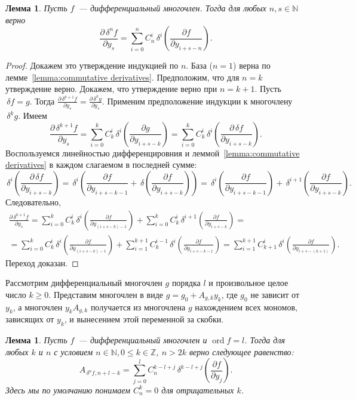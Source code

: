 \documentclass[11pt]{article}
\DeclareMathOperator{\ord}{ord}
\renewcommand{\le}{\leqslant}
\renewcommand{\ge}{\geqslant}
\theoremstyle{plain1}
\newtheorem{lemma}[theorem1]{Лемма}
\theoremstyle{plain2}
\theoremstyle{plain}
\theoremstyle{plain3}
\theoremstyle{definition}
\theoremstyle{remark}
\begin{document}
\begin{lemma}\label{lemma:f^(n)}
Пусть $f$~--- дифференциальный многочлен. Тогда для любых $n, s \in\mathbb{N}$ верно
$$
\frac{\partial \,\delta^n f}{\partial y_s} = \sum\limits_{i=0}^n  C_n^i  \,\delta^i \left(\frac{\partial f}{\partial y_{i+s-n}}\right).
$$
\end{lemma}
\begin{proof}
Докажем это утверждение индукцией по $n$.  База ($n=1$) верна по лемме~\ref{lemma:commutative derivatives}. Предположим, что для $n=k$ утверждение верно.
Докажем, что утверждение верно при $n=k+1$. Пусть $\,\delta f=g$. Тогда
$\frac{\partial \,\delta^{k+1} f}{\partial y_s} = \frac{\partial \,\delta^k g}{\partial y_s}$.
Применим предположение индукции к многочлену $\,\delta^k g$. Имеем 
$$
\frac{\partial \,\delta^{k+1} f}{\partial y_s} =  \sum\limits_{i=0}^k  C_k^i  \,\delta^i \left(\frac{\partial g}{\partial y_{i+s-k}}\right)=\sum\limits_{i=0}^k  C_k^i  \,\delta^i \left(\frac{\partial \,\delta f}{\partial y_{i+s-k}}\right). 
$$
Воспользуемся линейностью дифференцировния и леммой~\ref{lemma:commutative derivatives} в каждом слагаемом в последней сумме:  
$$
\,\delta^i \left(\frac{\partial \,\delta f}{\partial y_{i+s-k}}\right)=\,\delta^i\left(\frac{\partial f}{\partial y_{i+s-k-1}}+\,\delta\left(\frac{\partial f}{\partial y_{i+s-k}}\right)\right)=\,\delta^i\left(\frac{\partial f}{\partial y_{i+s-k-1}}\right)+\,\delta^{i+1}\left(\frac{\partial f}{\partial y_{i+s-k}}\right).
$$ 
Следовательно,
\begin{gather*}
\frac{\partial \,\delta^{k+1} f}{\partial y_s}=\sum\limits_{i=0}^k  C_k^i \,\delta^i \left(\frac{\partial f}{\partial y_{(i+s-k)-1}}\right)+\sum\limits_{i=0}^k  C_k^i \,\delta^{i+1} \left(\frac{\partial f}{\partial y_{i+s-k}}\right) = \\
= \sum\limits_{i=0}^k  C_k^i \,\delta^i \left(\frac{\partial f}{\partial y_{(i+s-k)-1}}\right)+\sum\limits_{i=1}^{k+1}  C_k^{i-1}\,\delta^i \left(\frac{\partial f}{\partial y_{i+s-k-1}}\right)=\sum\limits_{i=1}^{k+1} C_{k+1}^{i}\,\delta^i\left(\frac{\partial f}{\partial y_{i+s-(k+1)}}\right).
\end{gather*}
Переход доказан.
\end{proof}
Рассмотрим дифференциальный многочлен $g$ порядка $l$ и произвольное
целое число $k\ge0$. Представим многочлен в виде $g=g_0+A_{g,k}y_k$, где
$g_0$ не зависит от $y_k$, а многочлен $y_kA_{g,k}$ получается из
многочлена $g$ нахождением всех мономов, зависящих от $y_k$, и
вынесением этой переменной за скобки.
\begin{lemma}\label{lemma:A_fn}
Пусть $f$~--- дифференциальный многочлен и $\ord f = l$.
Тогда для любых $k$ и $n$ с условием  $n\in\mathbb{N},0\le k\in\mathbb{Z}$, $n>2k$ верно следующее
равенство:
$$
A_{\,\delta^n f, n+l-k}=\sum\limits_{j=0}^{l}C_n^{k - l + j
}\,\delta^{k-l+j}\left(\frac{\partial f}{\partial y_j}\right).
$$
Здесь мы по умолчанию понимаем $C_n^{k}=0$ для отрицательных
$k$.
\end{lemma}
\end{document}
